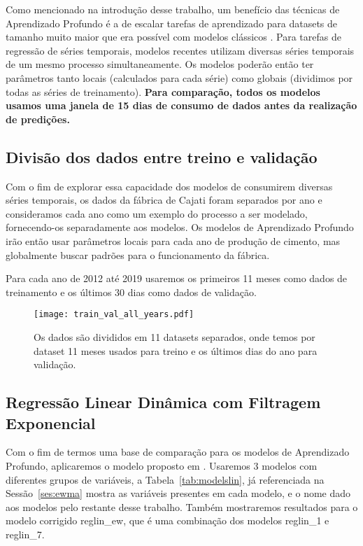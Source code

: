 Como mencionado na introdução desse trabalho, um benefício das técnicas de
Aprendizado Profundo é a de escalar tarefas de aprendizado para datasets de
tamanho muito maior que era possível com modelos clássicos \citep{dlbook}.
Para tarefas de regressão de séries temporais, modelos recentes utilizam
diversas séries temporais de um mesmo processo simultaneamente.
Os modelos poderão então ter parâmetros tanto locais (calculados
para cada série) como globais (dividimos por todas as séries de treinamento).
\textbf{Para comparação, todos os modelos usamos uma janela de 15 dias de consumo de dados antes da
  realização de predições.}

\subsection{Divisão dos dados entre treino e validação}

Com o fim de explorar essa capacidade dos modelos de consumirem diversas séries
temporais, os dados da fábrica de Cajati foram separados por ano e consideramos
cada ano como um exemplo do processo a ser modelado, fornecendo-os separadamente
aos modelos. Os modelos de Aprendizado
Profundo irão então usar parâmetros locais para cada ano de produção de cimento,
mas globalmente buscar padrões para o funcionamento da fábrica. 

Para cada ano de 2012 até 2019 usaremos os primeiros 11 meses como dados de
treinamento e os últimos 30 dias como dados de validação.


\begin{figure}[H]
  \centering
  \texttt{[image: train\_val\_all\_years.pdf]} 
  \caption{Os dados são divididos em 11 datasets separados, onde temos por
    dataset 11 meses usados para treino e os últimos dias do ano para validação.} 
  \label{fig:trainvalallyears}
\end{figure}

\subsection{Regressão Linear Dinâmica com Filtragem Exponencial}

Com o fim de termos uma base de comparação para os modelos de
Aprendizado Profundo, aplicaremos o modelo proposto em \citep{grecialin}.
Usaremos 3 modelos com diferentes grupos de variáveis, a
Tabela~\ref{tab:modelslin}, já referenciada na Sessão~\ref{ses:ewma} mostra
as variáveis presentes em cada modelo, e o nome dado aos modelos pelo restante
desse trabalho. Também mostraremos resultados para o modelo corrigido
reglin\_ew, que é uma combinação dos modelos reglin\_1 e reglin\_7.


